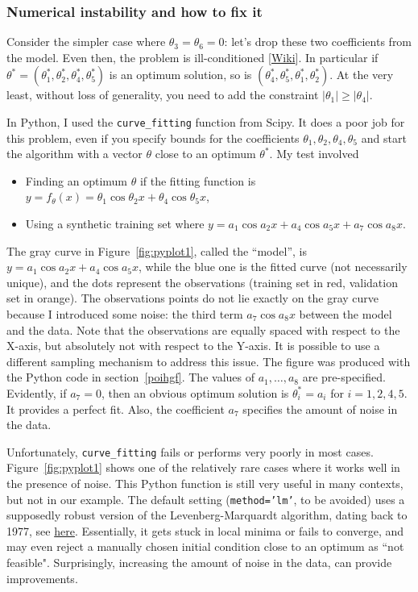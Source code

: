 \documentclass[oneside,10pt]{book}
\begin{document}
\subsubsection{Numerical instability and how to fix it}

Consider the simpler case where $\theta_3=\theta_6=0$: let's drop these two coefficients from the model. Even then, 
the problem is \textcolor{index}{ill-conditioned} [\href{https://en.wikipedia.org/wiki/Condition_number}{Wiki}]. In particular if $\theta^*=(\theta_1^*, \theta_2^*,\theta_4^*,\theta_5^*)$ is an optimum solution, so is $(\theta_4^*, \theta_5^*,\theta_1^*,\theta_2^*)$. At the very least, 
 without loss of generality, you need to add the
 constraint $|\theta_1|\geq |\theta_4|$. 

In Python, I used the \texttt{curve\_fitting} function from Scipy. It does a poor job for this problem, even if you specify bounds for the coefficients 
 $\theta_1, \theta_2,\theta_4,\theta_5$ and start the algorithm with a vector $\theta$ close to an optimum $\theta^*$. My test involved
\begin{itemize}
\item Finding an optimum $\theta$ if the fitting function is $y=f_\theta(x) =\theta_1 \cos \theta_2 x +  \theta_4 \cos \theta_5 x$,
\item Using a synthetic training set where  $y=a_1 \cos a_2 x +  a_4 \cos a_5 x + a_7 \cos a_8 x$.
\end{itemize}
 The gray curve in  Figure~\ref{fig:pyplot1}, called the ``model'', is $y=a_1 \cos a_2 x +  a_4 \cos a_5 x$, 
 while the blue one is the fitted curve (not necessarily unique), and the dots represent the observations (training set in red, validation set in orange). 
The observations points do not lie exactly on the gray curve because I introduced some noise: the third term $a_7 \cos a_8 x$ between the model and the data. Note that the observations are equally spaced with respect to the X-axis, but absolutely not with respect to the Y-axis. It is possible
 to use a different sampling mechanism to address this issue. 
 The figure was produced with the Python code in section~\ref{poihgf}. The values of $a_1,\dots,a_8$ are pre-specified. Evidently, if $a_7=0$, then an obvious optimum solution is
 $\theta_i^*=a_i$ for $i=1,2,4,5$. It provides a perfect fit. Also, the coefficient $a_7$ specifies the amount of noise in the data. 


Unfortunately,  \texttt{curve\_fitting} fails or performs very poorly in most cases. Figure~\ref{fig:pyplot1} shows one of the relatively rare cases where it
 works well in the presence of noise. This Python function is still very useful in many contexts, but not in our example. The default setting 
(\texttt{method='lm'}, to be avoided) uses a supposedly robust version of the Levenberg-Marquardt algorithm, dating back to 1977, 
 see \href{https://docs.scipy.org/doc/scipy/reference/generated/scipy.optimize.least_squares.html}{here}. Essentially, it gets stuck in
 local minima or fails to converge, and may even reject a manually chosen initial condition close to an optimum as ``not feasible". Surprisingly,
 increasing the amount of noise in the data, can provide improvements. 
\end{document}
